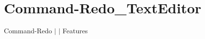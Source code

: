 \chapter{Command-\/\+Redo\+\_\+\+Text\+Editor }
\hypertarget{md__docs_2_text_editor_2_features_2_command-_redo___text_editor}{}\label{md__docs_2_text_editor_2_features_2_command-_redo___text_editor}
Command-\/\+Redo \texorpdfstring{$\vert$}{|}  \texorpdfstring{$\vert$}{|} Features



 